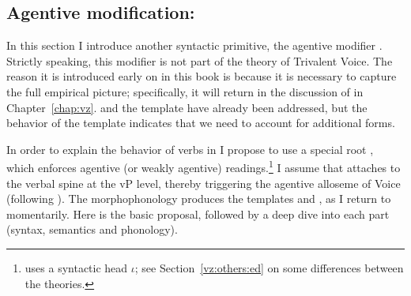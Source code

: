 \begin{exe}
\begin{xlist}
\begin{exe}
\begin{xlist}
\begin{exe}
\begin{xlist}
\begin{exe}
\begin{exe}
\begin{xlist}
\begin{exe}
\begin{xlist}
\begin{exe}
\begin{xlist}
\begin{exe}
\begin{xlist}
\begin{exe}
\begin{xlist}
\begin{exe}
\begin{xlist}
\begin{exe}
\begin{xlist}
\begin{exe}
\begin{xlist}
\begin{xlist}
\begin{exe}
\begin{xlist}
\begin{exe}
\begin{xlist}
\begin{exe}
\begin{xlist}
\begin{exe}
\begin{xlist}
\begin{exe}
\begin{xlist}
\begin{exe}
\begin{xlist}
\begin{exe}
\begin{xlist}
\begin{exe}
\begin{xlist}
\begin{exe}
\begin{xlist}
\begin{exe}
\begin{xlist}
\begin{exe}
\begin{xlist}
\begin{exe}
\begin{xlist}
\begin{xlist}
\begin{xlist}
\begin{exe}
\begin{xlist}
\begin{xlist}
\begin{xlist}
\begin{exe}
\begin{exe}
\begin{xlist}
\begin{exe}
\begin{xlist}
\begin{exe}
\begin{xlist}
\begin{exe}
\begin{xlist}
\begin{exe}
\begin{xlist}
\begin{exe}
\begin{xlist}
\begin{exe}
\begin{xlist}
\begin{exe}
\begin{exe}
\begin{xlist}
\begin{xlist}
\begin{exe}
\begin{xlist}
\begin{exe}
\begin{xlist}
\begin{exe}
\begin{xlist}
\begin{exe}
\begin{xlist}
\section{Agentive modification: \va} \label{voice:va}
In this section I introduce another syntactic primitive, the agentive modifier {\va}. Strictly speaking, this modifier is not part of the theory of Trivalent Voice. The reason it is introduced early on in this book is because it is necessary to capture the full empirical picture; specifically, it will return in the discussion of {\vz} in Chapter~\ref{chap:vz}.  and the template {\tkal} have already been addressed, but the behavior of the template {\tpie} indicates that we need to account for additional forms.

In order to explain the behavior of verbs in {\tpie} I propose to use a special root {\va}, which enforces agentive (or weakly agentive) readings.\footnote{\cite{doron03} uses a syntactic head $\iota$; see Section~\ref{vz:others:ed} on some differences between the theories.} I assume that {\va} attaches to the verbal spine at the vP level, thereby triggering the agentive alloseme of Voice (following \citealt{doron03,doron14adj}). The morphophonology produces the templates {\tpie} and {\thit}, as I return to momentarily. Here is the basic proposal, followed by a deep dive into each part (syntax, semantics and phonology).

\end{xlist}
\end{exe}
\end{xlist}
\end{exe}
\end{xlist}
\end{exe}
\end{xlist}
\end{exe}
\end{xlist}
\end{xlist}
\end{exe}
\end{exe}
\end{xlist}
\end{exe}
\end{xlist}
\end{exe}
\end{xlist}
\end{exe}
\end{xlist}
\end{exe}
\end{xlist}
\end{exe}
\end{xlist}
\end{exe}
\end{xlist}
\end{exe}
\end{exe}
\end{xlist}
\end{xlist}
\end{xlist}
\end{exe}
\end{xlist}
\end{xlist}
\end{xlist}
\end{exe}
\end{xlist}
\end{exe}
\end{xlist}
\end{exe}
\end{xlist}
\end{exe}
\end{xlist}
\end{exe}
\end{xlist}
\end{exe}
\end{xlist}
\end{exe}
\end{xlist}
\end{exe}
\end{xlist}
\end{exe}
\end{xlist}
\end{exe}
\end{xlist}
\end{exe}
\end{xlist}
\end{exe}
\end{xlist}
\end{xlist}
\end{exe}
\end{xlist}
\end{exe}
\end{xlist}
\end{exe}
\end{xlist}
\end{exe}
\end{xlist}
\end{exe}
\end{xlist}
\end{exe}
\end{xlist}
\end{exe}
\end{xlist}
\end{exe}
\end{exe}
\end{xlist}
\end{exe}
\end{xlist}
\end{exe}
\end{xlist}
\end{exe}

